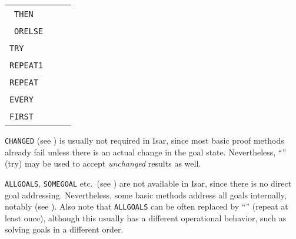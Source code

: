 \begin{isabellebody}
\begin{isamarkuptext}
  \medskip
  \begin{tabular}{lll}
    \isa{{\isachardoublequote}tac\isactrlsub {\isadigit{1}}{\isachardoublequote}}~\verb|THEN|~\isa{{\isachardoublequote}tac\isactrlsub {\isadigit{2}}{\isachardoublequote}} & & \isa{{\isachardoublequote}meth\isactrlsub {\isadigit{1}}{\isacharcomma}\ meth\isactrlsub {\isadigit{2}}{\isachardoublequote}} \\
    \isa{{\isachardoublequote}tac\isactrlsub {\isadigit{1}}{\isachardoublequote}}~\verb|ORELSE|~\isa{{\isachardoublequote}tac\isactrlsub {\isadigit{2}}{\isachardoublequote}} & & \isa{{\isachardoublequote}meth\isactrlsub {\isadigit{1}}\ {\isacharbar}\ meth\isactrlsub {\isadigit{2}}{\isachardoublequote}} \\
    \verb|TRY|~\isa{tac} & & \isa{{\isachardoublequote}meth{\isacharquery}{\isachardoublequote}} \\
    \verb|REPEAT1|~\isa{tac} & & \isa{{\isachardoublequote}meth{\isacharplus}{\isachardoublequote}} \\
    \verb|REPEAT|~\isa{tac} & & \isa{{\isachardoublequote}{\isacharparenleft}meth{\isacharplus}{\isacharparenright}{\isacharquery}{\isachardoublequote}} \\
    \verb|EVERY|~\isa{{\isachardoublequote}{\isacharbrackleft}tac\isactrlsub {\isadigit{1}}{\isacharcomma}\ {\isasymdots}{\isacharbrackright}{\isachardoublequote}} & & \isa{{\isachardoublequote}meth\isactrlsub {\isadigit{1}}{\isacharcomma}\ {\isasymdots}{\isachardoublequote}} \\
    \verb|FIRST|~\isa{{\isachardoublequote}{\isacharbrackleft}tac\isactrlsub {\isadigit{1}}{\isacharcomma}\ {\isasymdots}{\isacharbrackright}{\isachardoublequote}} & & \isa{{\isachardoublequote}meth\isactrlsub {\isadigit{1}}\ {\isacharbar}\ {\isasymdots}{\isachardoublequote}} \\
  \end{tabular}
  \medskip

  \medskip \verb|CHANGED| (see \cite{isabelle-ref}) is usually not
  required in Isar, since most basic proof methods already fail unless
  there is an actual change in the goal state.  Nevertheless, ``\isa{{\isachardoublequote}{\isacharquery}{\isachardoublequote}}''  (try) may be used to accept \emph{unchanged} results as
  well.

  \medskip \verb|ALLGOALS|, \verb|SOMEGOAL| etc.\ (see
  \cite{isabelle-ref}) are not available in Isar, since there is no
  direct goal addressing.  Nevertheless, some basic methods address
  all goals internally, notably \hyperlink{method.simp-all}{\mbox{}} (see
  ).  Also note that \verb|ALLGOALS| can be
  often replaced by ``\isa{{\isachardoublequote}{\isacharplus}{\isachardoublequote}}'' (repeat at least once), although
  this usually has a different operational behavior, such as solving
  goals in a different order.


\end{isamarkuptext}
\end{isabellebody}
